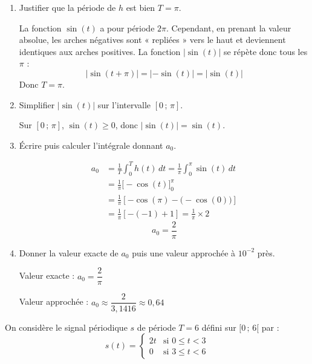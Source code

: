 \documentclass[a4paper,11pt]{article}
\begin{document}
\begin{enumerate}[label=\textbf{\alph*)}]
  \item Justifier que la période de $h$ est bien $T = \pi$.
  \begin{tcolorbox}[corrigebox]
    La fonction $\sin(t)$ a pour période $2\pi$. Cependant, en prenant la valeur absolue, les arches négatives sont « repliées » vers le haut et deviennent identiques aux arches positives. La fonction $|\sin(t)|$ se répète donc tous les $\pi$ :
    \[
      |\sin(t+\pi)| = |-\sin(t)| = |\sin(t)|
    \]
    Donc $T = \pi$.
  \end{tcolorbox}

  \item Simplifier $|{\sin(t)}|$ sur l'intervalle $[0\,;\,\pi]$.
  \begin{tcolorbox}[corrigebox]
    Sur $[0\,;\,\pi]$, $\sin(t) \geq 0$, donc $|\sin(t)| = \sin(t)$.
  \end{tcolorbox}

  \item Écrire puis calculer l'intégrale donnant $a_0$.
  \begin{tcolorbox}[corrigebox]
    \begin{align*}
      a_0 &= \frac{1}{T}\int_0^T h(t)\,dt = \frac{1}{\pi}\int_0^{\pi} \sin(t)\,dt \\
          &= \frac{1}{\pi}\Big[-\cos(t)\Big]_0^{\pi} \\
          &= \frac{1}{\pi}\left[-\cos(\pi) - \bigl(-\cos(0)\bigr)\right] \\
          &= \frac{1}{\pi}\left[-(-1) + 1\right] = \frac{1}{\pi}\times 2
    \end{align*}
    \[\boxed{a_0 = \frac{2}{\pi}}\]
  \end{tcolorbox}

  \item Donner la valeur exacte de $a_0$ puis une valeur approchée à $10^{-2}$ près.
  \begin{tcolorbox}[corrigebox]
    Valeur exacte : $a_0 = \dfrac{2}{\pi}$

    \medskip
    Valeur approchée : $a_0 \approx \dfrac{2}{3{,}1416} \approx 0{,}64$
  \end{tcolorbox}
\end{enumerate}

\vspace{0.3cm}

\begin{tcolorbox}[exobox={Exercice 4 -- Synthèse}]
  On considère le signal périodique $s$ de période $T = 6$ défini sur $[0\,;\,6[$ par :
  \[
    s(t) = \begin{cases} 2t & \text{si } 0 \leq t < 3 \\ 0 & \text{si } 3 \leq t < 6 \end{cases}
  \]
\end{tcolorbox}
\end{document}
